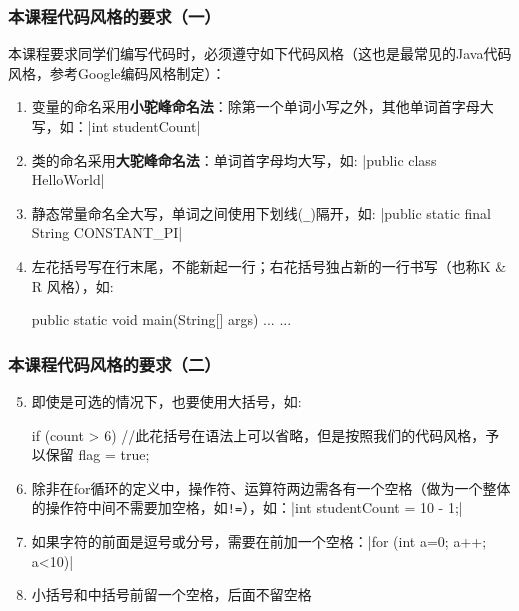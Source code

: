 \begin{frame}[fragile]
  \frametitle{本课程代码风格的要求（一）}
  本课程要求同学们编写代码时，必须遵守如下代码风格（这也是最常见的Java代码风格，参考Google编码风格制定）：
  \begin{enumerate}
    \item 变量的命名采用\textbf{小驼峰命名法}：除第一个单词小写之外，其他单词首字母大写，如：\java|int studentCount|
    \item 类的命名采用\textbf{大驼峰命名法}：单词首字母均大写，如: \java|public class HelloWorld|
    \item 静态常量命名全大写，单词之间使用下划线(\texttt{\_})隔开，如: \java|public static final String CONSTANT_PI|
    \item 左花括号写在行末尾，不能新起一行；右花括号独占新的一行书写（也称K \& R 风格），如:
      \begin{javacode}
        public static void main(String[] args) {
        ... ...
        }  
      \end{javacode}
  \end{enumerate}
\end{frame}

\begin{frame}[fragile]
  \frametitle{本课程代码风格的要求（二）}
  \begin{enumerate}
    \setcounter{enumi}{4}
    \item 即使是可选的情况下，也要使用大括号，如:
      \begin{javacode}
        if (count > 6) { //此花括号在语法上可以省略，但是按照我们的代码风格，予以保留
          flag = true; 
        }  
      \end{javacode}
    \item 除非在for循环的定义中，操作符、运算符两边需各有一个空格（做为一个整体的操作符中间不需要加空格，如\texttt{!=}），如：\java|int studentCount = 10 - 1;|
    \item 如果字符的前面是逗号或分号，需要在前加一个空格：\java|for (int a=0; a++; a<10)|
    \item 小括号和中括号前留一个空格，后面不留空格

  \end{enumerate}
\end{frame}

